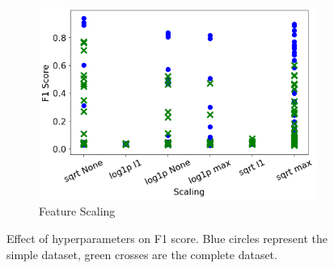 \begin{figure}[H]
     \begin{subfigure}[b]{0.49\textwidth}
         \centering
         \includegraphics[width=\textwidth]{images/dnn_scaler.png}
         \caption{Feature Scaling}
         \label{fig:dnn_scaler}
     \end{subfigure}

        \caption{Effect of hyperparameters on F1 score. Blue circles represent the simple dataset, green crosses are the complete dataset.}
        \label{fig:dense_hyperparameters_f1_score}
\end{figure}







